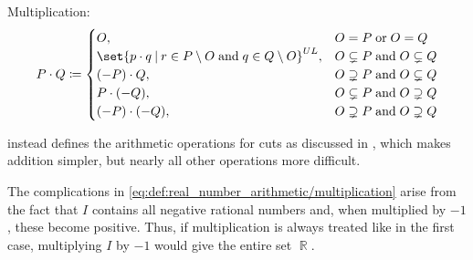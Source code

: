 \begin{definition}
\begin{thmenum}
     Multiplication:
    \begin{equation}\label{eq:def:real_number_arithmetic/multiplication}
      P \cdot Q \coloneqq \begin{cases}
        O,                                                                             &O = P \T{or} O = Q \\
        \set{ p \cdot q \given r \in P \setminus O \T{and} q \in Q \setminus O }^{UL}, &O \subsetneq P \T{and} O \subsetneq Q \\
        (-P) \cdot Q,                                                                  &O \supsetneq P \T{and} O \subsetneq Q \\
        P \cdot (-Q),                                                                  &O \subsetneq P \T{and} O \supsetneq Q \\
        (-P) \cdot (-Q),                                                               &O \supsetneq P \T{and} O \supsetneq Q \\
      \end{cases}
    \end{equation}
  \end{thmenum}
\end{definition}
\begin{comments}
  \item {} instead defines the arithmetic operations for cuts as discussed in , which makes addition simpler, but nearly all other operations more difficult.
  \item The complications in \eqref{eq:def:real_number_arithmetic/multiplication} arise from the fact that \( I \) contains all negative rational numbers and, when multiplied by \( -1 \), these become positive. Thus, if multiplication is always treated like in the first case, multiplying \( I \) by \( -1 \) would give the entire set \( \BbbR \).
\end{comments}

